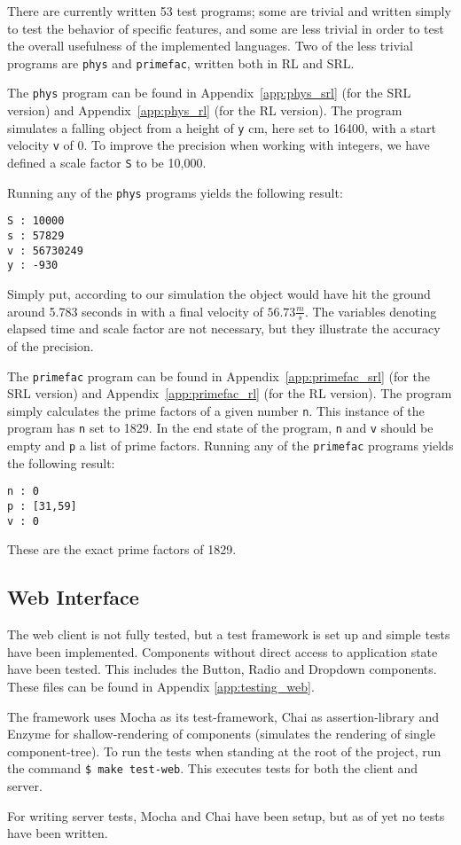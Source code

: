 There are currently written 53 test programs; some are trivial and written simply to test the behavior of specific features, and some are less trivial in order to test the overall usefulness of the implemented languages. Two of the less trivial programs are \texttt{phys} and \texttt{primefac}, written both in RL and SRL.

The \texttt{phys} program can be found in Appendix~\ref{app:phys_srl} (for the SRL version) and Appendix~\ref{app:phys_rl} (for the RL version).
The program simulates a falling object from a height of \texttt{y} cm, here set to 16400, with a start velocity \texttt{v} of 0. To improve the precision when working with integers, we have defined a scale factor \texttt{S} to be 10,000.

Running any of the \texttt{phys} programs yields the following result:
\begin{verbatim}
S : 10000
s : 57829
v : 56730249
y : -930
\end{verbatim}
Simply put, according to our simulation the object would have hit the ground around 5.783 seconds in with a final velocity of $56.73 \frac{m}{s}$. The variables denoting elapsed time and scale factor are not necessary, but they illustrate the accuracy of the precision.


The \texttt{primefac} program can be found in Appendix~\ref{app:primefac_srl} (for the SRL version) and Appendix~\ref{app:primefac_rl} (for the RL version). The program simply calculates the prime factors of a given number \texttt{n}. This instance of the program has \texttt{n} set to 1829. In the end state of the program, \texttt{n} and \texttt{v} should be empty and \texttt{p} a list of prime factors. Running any of the \texttt{primefac} programs yields the following result:
\begin{verbatim}
n : 0
p : [31,59]
v : 0
\end{verbatim}
These are the exact prime factors of 1829.


\subsection{Web Interface}

The web client is not fully tested, but a test framework is set up and simple tests have been implemented. Components without direct access to application state have been tested. This includes the Button, Radio and Dropdown components.
These files can be found in Appendix \ref{app:testing_web}.

The framework uses Mocha as its test-framework, Chai as assertion-library and Enzyme for shallow-rendering of components (simulates the rendering of single component-tree).
To run the tests when standing at the root of the project, run the command \texttt{\$ make test-web}.
This executes tests for both the client and server.

For writing server tests, Mocha and Chai have been setup, but as of yet no tests have been written.

